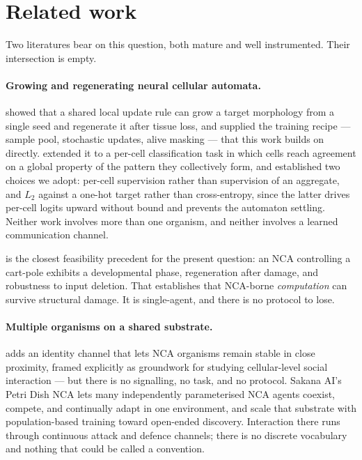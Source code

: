 \section{Related work}
\label{sec:related}

Two literatures bear on this question, both mature and well instrumented. Their
intersection is empty.

\paragraph{Growing and regenerating neural cellular automata.}
\citet{mordvintsev2020growing} showed that a shared local update rule can grow a
target morphology from a single seed and regenerate it after tissue loss, and
supplied the training recipe --- sample pool, stochastic updates, alive masking
--- that this work builds on directly. \citet{randazzo2020selfclassifying}
extended it to a per-cell classification task in which cells reach agreement on a
global property of the pattern they collectively form, and established two
choices we adopt: per-cell supervision rather than supervision of an aggregate,
and $L_2$ against a one-hot target rather than cross-entropy, since the latter
drives per-cell logits upward without bound and prevents the automaton settling.
Neither work involves more than one organism, and neither involves a learned
communication channel.

\citet{variengien2021towards} is the closest feasibility precedent for the
present question: an NCA controlling a cart-pole exhibits a developmental phase,
regeneration after damage, and robustness to input deletion. That establishes
that NCA-borne \emph{computation} can survive structural damage. It is
single-agent, and there is no protocol to lose.

\paragraph{Multiple organisms on a shared substrate.}
\citet{stovold2025identity} adds an identity channel that lets NCA organisms
remain stable in close proximity, framed explicitly as groundwork for studying
cellular-level social interaction --- but there is no signalling, no task, and no
protocol. Sakana AI's Petri Dish NCA \citep{sakana2026pdnca} lets many
independently parameterised NCA agents coexist, compete, and continually adapt in
one environment, and \citet{berdica2026evolving} scale that substrate with
population-based training toward open-ended discovery. Interaction there runs
through continuous attack and defence channels; there is no discrete vocabulary
and nothing that could be called a convention.


